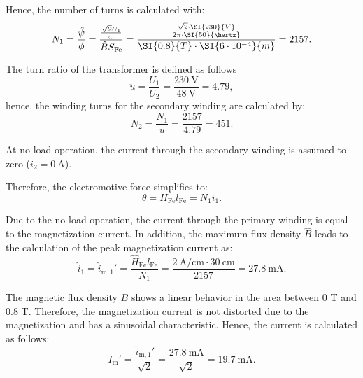 \begin{solutionblock}
  Hence, the number of turns is calculated with:
  \begin{equation}
    N_{\mathrm{1}} = \frac{\hat{\psi}}{\phi}
    = \frac{\frac{\sqrt{2}U_{\mathrm{1}}}{\omega}}{\hat{B} S_{\mathrm{Fe}}}
    =\frac{\frac{\sqrt{2} \cdot \SI{230}{V}}{2\pi \cdot \SI{50}{\hertz}}}{\SI{0.8}{T} \cdot \SI{6\cdot 10^{-4}}{m}}
    = 2157.
    \label{eq:eq1}
  \end{equation}


  The turn ratio of the transformer is defined as follows
  \begin{equation}
    \ddot{u} = \frac{U_{\mathrm{1}}}{U_{\mathrm{2}}}
    = \frac{\SI{230}{\volt}}{\SI{48}{\volt}}
    = 4.79,
  \end{equation}
  hence, the winding turns for the secondary winding are calculated by:
  \begin{equation}
    N_{\mathrm{2}} = \frac{N_{\mathrm{1}}}{\ddot{u}}
    = \frac{2157}{4.79}
    = 451.
  \end{equation}

\end{solutionblock}



\begin{solutionblock}
  
  At no-load operation, the current through the secondary winding is assumed to zero ($i_{\mathrm{2}} = \SI{0}{\ampere}$).
  
  Therefore, the electromotive force simplifies to:
  \begin{equation}
    \theta = H_{\mathrm{Fe}} l_{\mathrm{Fe}}
    = N_{\mathrm{1}} i_{\mathrm{1}}.
  \end{equation}

  Due to the no-load operation, the current through the primary winding is equal to the magnetization current. In addition, the maximum flux density $\hat{B}$ leads to the calculation of the peak magnetization current as:
  \begin{equation}
    \hat{i}_{\mathrm{1}} = \hat{i}_{\mathrm{m,1}}'
    = \frac{\hat{H}_{\mathrm{Fe}} l_{\mathrm{Fe}}}{N_{\mathrm{1}}}
    = \frac{\SI{2}{\ampere \per \centi \metre} \cdot \SI{30}{\centi \metre}}{2157}
    = \SI{27.8}{\milli \ampere}.
  \end{equation}


  The magnetic flux density $B$ shows a linear behavior in the area between 0 T and 0.8 T. Therefore, the magnetization current is not distorted due to the magnetization and has a sinusoidal characteristic.
  Hence, the current is calculated as follows:
  \begin{equation}
    I_{\mathrm{m}}' = \frac{\hat{i}_{\mathrm{m,1}}'}{\sqrt{2}}
    = \frac{\SI{27.8}{\milli\ampere}}{\sqrt{2}}
    = \SI{19.7}{\milli \ampere}.
  \end{equation}

  

\end{solutionblock}


